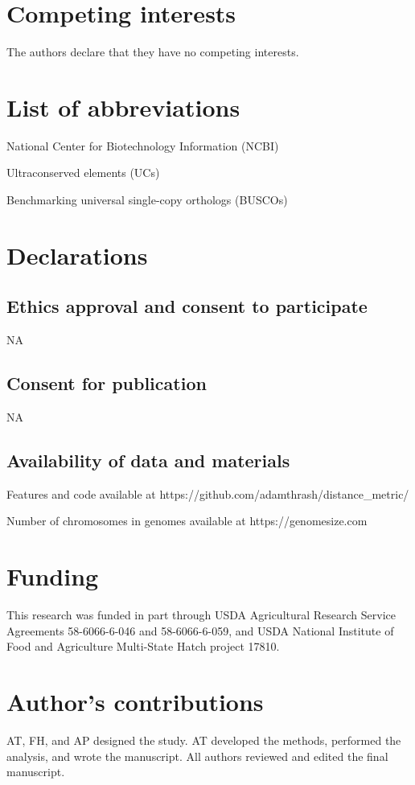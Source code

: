 \documentclass[twocolumn, dvipsnames]{bmcart}%
\begin{document}
\begin{backmatter}

\section*{Competing interests}
The authors declare that they have no competing interests.

\section*{List of abbreviations}
National Center for Biotechnology Information (NCBI)

Ultraconserved elements (UCs)

Benchmarking universal single-copy orthologs (BUSCOs)

\section*{Declarations}

\subsection*{Ethics approval and consent to participate}
NA

\subsection*{Consent for publication}
NA

\subsection*{Availability of data and materials}
Features and code available at https://github.com/adamthrash/distance\_metric/

Number of chromosomes in genomes available at https://genomesize.com

\section*{Funding}
This research was funded in part through USDA Agricultural Research Service Agreements 58-6066-6-046 and 58-6066-6-059, and USDA National Institute of Food and Agriculture Multi-State Hatch project 17810.

\section*{Author's contributions}
AT, FH, and AP designed the study. AT developed the methods, performed the analysis, and wrote the manuscript. All authors reviewed and edited the final manuscript.


\end{backmatter}
\end{document}
